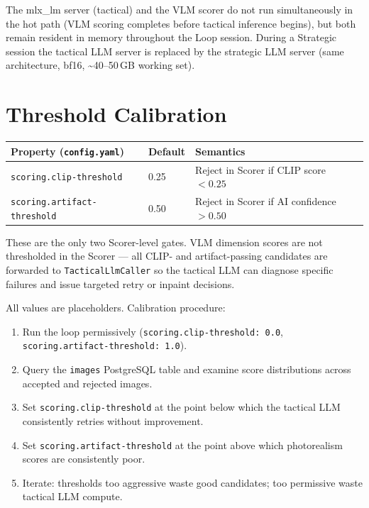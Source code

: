\documentclass[11pt,letterpaper]{article}
\begin{document}
The mlx\_lm server (tactical) and the VLM scorer do not run simultaneously
in the hot path (VLM scoring completes before tactical inference begins),
but both remain resident in memory throughout the Loop session. During
a Strategic session the tactical LLM server is replaced by the strategic
LLM server (same architecture, bf16, \textasciitilde40--50\,GB working set).

\section{Threshold Calibration}

\begin{center}
\begin{tabular}{lll}
\toprule
\textbf{Property (\texttt{config.yaml})} & \textbf{Default} & \textbf{Semantics} \\
\midrule
\texttt{scoring.clip-threshold}     & 0.25 & Reject in Scorer if CLIP score $< 0.25$ \\
\texttt{scoring.artifact-threshold} & 0.50 & Reject in Scorer if AI confidence $> 0.50$ \\
\bottomrule
\end{tabular}
\end{center}

These are the only two Scorer-level gates. VLM dimension scores are not
thresholded in the Scorer --- all CLIP- and artifact-passing candidates are
forwarded to \texttt{TacticalLlmCaller} so the tactical LLM can diagnose
specific failures and issue targeted retry or inpaint decisions.

All values are placeholders. Calibration procedure:

\begin{enumerate}
  \item Run the loop permissively (\texttt{scoring.clip-threshold: 0.0},
        \texttt{scoring.artifact-threshold: 1.0}).
  \item Query the \texttt{images} PostgreSQL table and examine score
        distributions across accepted and rejected images.
  \item Set \texttt{scoring.clip-threshold} at the point below which the
        tactical LLM consistently retries without improvement.
  \item Set \texttt{scoring.artifact-threshold} at the point above which
        photorealism scores are consistently poor.
  \item Iterate: thresholds too aggressive waste good candidates; too permissive
        waste tactical LLM compute.
\end{enumerate}
\end{document}
